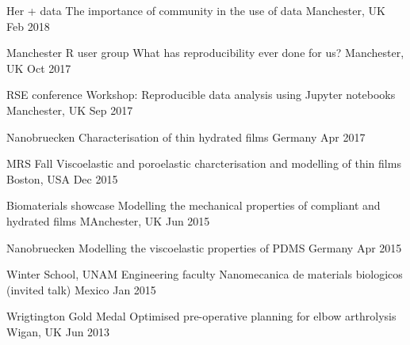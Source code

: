 


\begin{cvpresentations}

\cvpresentation
{Her + data} %
{The importance of community in the use of data} %
{Manchester, UK} %
{Feb 2018} %




\cvpresentation
{Manchester R user group} %
{What has reproducibility ever done for us?} %
{Manchester, UK} %
{Oct 2017} %



\cvpresentation
{RSE conference} %
{Workshop: Reproducible data analysis using Jupyter notebooks} %
{Manchester, UK} %
{Sep 2017} %


\cvpresentation
{Nanobruecken }
{Characterisation of thin hydrated films}
{Germany}
{Apr 2017}


\cvpresentation
{MRS Fall }
{Viscoelastic and poroelastic charcterisation and modelling of thin films}
{Boston, USA}
{Dec 2015}


\cvpresentation
{Biomaterials showcase}
{Modelling the mechanical properties of compliant and hydrated films}
{MAnchester, UK}
{Jun 2015}


\cvpresentation
{Nanobruecken }
{Modelling the viscoelastic properties of PDMS}
{Germany}
{Apr 2015}


\cvpresentation
{Winter School, UNAM Engineering faculty}
{Nanomecanica de materials biologicos (invited talk)}
{Mexico}
{Jan 2015}


\cvpresentation
{Wrigtington Gold Medal}
{Optimised pre-operative planning for elbow arthrolysis}
{Wigan, UK}
{Jun 2013}

\end{cvpresentations}